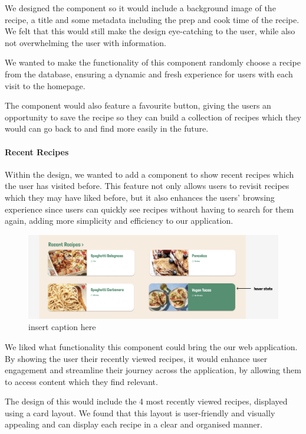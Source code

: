 \documentclass{article}
\begin{document}
We designed the component so it would include a background image of the recipe, a title and some metadata including the prep and cook time of the recipe. We felt that this would still make the design eye-catching to the user, while also not overwhelming the user with information.

We wanted to make the functionality of this component randomly choose a recipe from the database, ensuring a dynamic and fresh experience for users with each visit to the homepage.

The component would also feature a favourite button, giving the users an opportunity to save the recipe so they can build a collection of recipes which they would can go back to and find more easily in the future.

\paragraph{Recent Recipes}
Within the design, we wanted to add a component to show recent recipes which the user has visited before. This feature not only allows users to revisit recipes which they may have liked before, but it also enhances the users' browsing experience since users can quickly see recipes without having to search for them again, adding more simplicity and efficiency to our application.

\begin{figure}[h]
  \includegraphics[width=1.0\textwidth]{assets/Version 1 Recent Recipes.png}
  \centering
  \caption{insert caption here}
\end{figure}

We liked what functionality this component could bring the our web application. By showing the user their recently viewed recipes, it would enhance user engagement and streamline their journey across the application, by allowing them to access content which they find relevant.

The design of this would include the 4 most recently viewed recipes, displayed using a card layout. We found that this layout is user-friendly and visually appealing and can display each recipe in a clear and organised manner.
\end{document}
